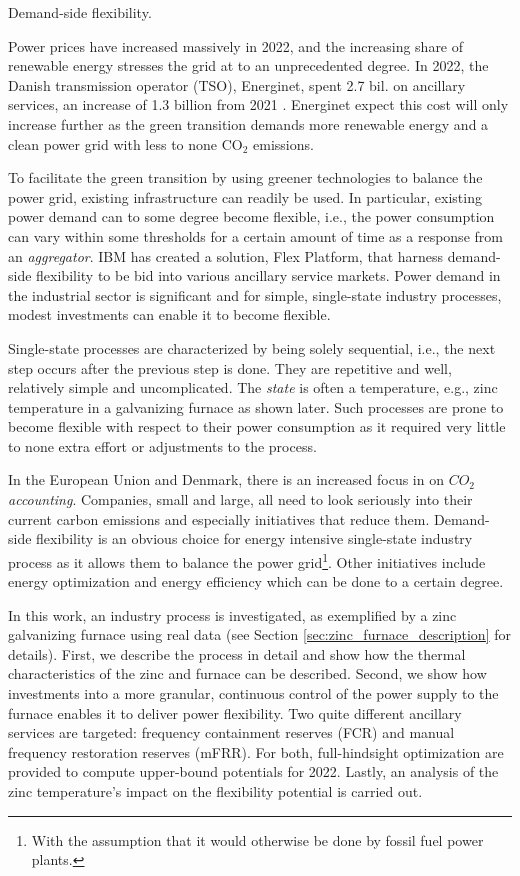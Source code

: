 \documentclass[lettersize,journal]{IEEEtran}
\begin{document}
\begin{IEEEkeywords}
    Demand-side flexibility.
\end{IEEEkeywords}



Power prices have increased massively in 2022, and the increasing share of renewable energy stresses the grid at to an unprecedented degree. In 2022, the Danish transmission operator (TSO), Energinet, spent 2.7 bil. on ancillary services, an increase of 1.3 billion from 2021 \cite{energinetOmkostninger}. Energinet expect this cost will only increase further as the green transition demands more renewable energy and a clean power grid with less to none CO$_{2}$ emissions.

To facilitate the green transition by using greener technologies to balance the power grid, existing infrastructure can readily be used. In particular, existing power demand can to some degree become flexible, i.e., the power consumption can vary within some thresholds for a certain amount of time as a response from an \textit{aggregator}. IBM has created a solution, Flex Platform, that harness demand-side flexibility to be bid into various ancillary service markets. Power demand in the industrial sector is significant and for simple, single-state industry processes, modest investments can enable it to become flexible.

Single-state processes are characterized by being solely sequential, i.e., the next step occurs after the previous step is done. They are repetitive and well, relatively simple and uncomplicated. The \textit{state} is often a temperature, e.g., zinc temperature in a galvanizing furnace as shown later. Such processes are prone to become flexible with respect to their power consumption as it required very little to none extra effort or adjustments to the process.

In the European Union and Denmark, there is an increased focus in on $CO_{2}$ \textit{accounting}. Companies, small and large, all need to look seriously into their current carbon emissions and especially initiatives that reduce them. Demand-side flexibility is an obvious choice for energy intensive single-state industry process as it allows them to balance the power grid\footnote{With the assumption that it would otherwise be done by fossil fuel power plants.}. Other initiatives include energy optimization and energy efficiency which can be done to a certain degree.

In this work, an industry process is investigated, as exemplified by a zinc galvanizing furnace using real data (see Section \ref{sec:zinc_furnace_description} for details). First, we describe the process in detail and show how the thermal characteristics of the zinc and furnace can be described. Second, we show how investments into a more granular, continuous control of the power supply to the furnace enables it to deliver power flexibility. Two quite different ancillary services are targeted: frequency containment reserves (FCR) and manual frequency restoration reserves (mFRR). For both, full-hindsight optimization are provided to compute upper-bound potentials for 2022. Lastly, an analysis of the zinc temperature's impact on the flexibility potential is carried out.
\end{document}
